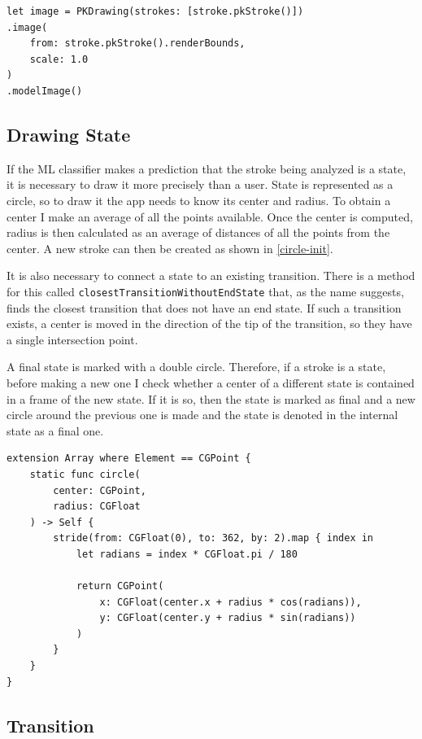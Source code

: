 \begin{lstlisting}[caption=Automata classifier, label=strokes-conversion]
let image = PKDrawing(strokes: [stroke.pkStroke()])
.image(
    from: stroke.pkStroke().renderBounds,
    scale: 1.0
)
.modelImage()
\end{lstlisting}

\subsection{Drawing State}

If the ML classifier makes a prediction that the stroke being analyzed is a state, it is necessary to draw it more precisely than a user. State is represented as a circle, so to draw it the app needs to know its center and radius. To obtain a center I make an average of all the points available. Once the center is computed, radius is then calculated as an average of distances of all the points from the center. A new stroke can then be created as shown in \ref{circle-init}.

It is also necessary to connect a state to an existing transition. There is a method for this called \lstinline{closestTransitionWithoutEndState} that, as the name suggests, finds the closest transition that does not have an end state. If such a transition exists, a center is moved in the direction of the tip of the transition, so they have a single intersection point.

A final state is marked with a double circle. Therefore, if a stroke is a state, before making a new one I check whether a center of a different state is contained in a frame of the new state. If it is so, then the state is marked as final and a new circle around the previous one is made and the state is denoted in the internal state as a final one.

\begin{lstlisting}[caption=Circle stroke, label=circle-init]
extension Array where Element == CGPoint {
    static func circle(
        center: CGPoint,
        radius: CGFloat
    ) -> Self {
        stride(from: CGFloat(0), to: 362, by: 2).map { index in
            let radians = index * CGFloat.pi / 180
            
            return CGPoint(
                x: CGFloat(center.x + radius * cos(radians)),
                y: CGFloat(center.y + radius * sin(radians))
            )
        }
    }
}
\end{lstlisting}

\subsection{Transition}

